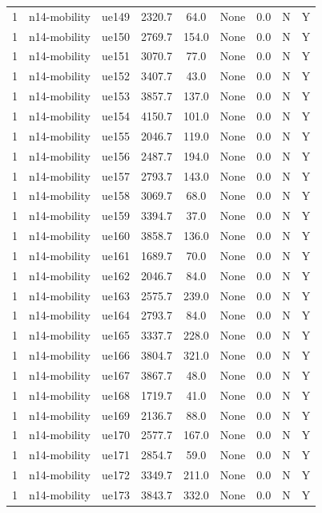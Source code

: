\begin{table}[ht]
\begin{tabular}{|c|c|c|c|c|c|c|c|c|}
1 & n14-mobility & ue149 & 2320.7 & 64.0 & None & 0.0 & N & Y \\
1 & n14-mobility & ue150 & 2769.7 & 154.0 & None & 0.0 & N & Y \\
1 & n14-mobility & ue151 & 3070.7 & 77.0 & None & 0.0 & N & Y \\
1 & n14-mobility & ue152 & 3407.7 & 43.0 & None & 0.0 & N & Y \\
1 & n14-mobility & ue153 & 3857.7 & 137.0 & None & 0.0 & N & Y \\
1 & n14-mobility & ue154 & 4150.7 & 101.0 & None & 0.0 & N & Y \\
1 & n14-mobility & ue155 & 2046.7 & 119.0 & None & 0.0 & N & Y \\
1 & n14-mobility & ue156 & 2487.7 & 194.0 & None & 0.0 & N & Y \\
1 & n14-mobility & ue157 & 2793.7 & 143.0 & None & 0.0 & N & Y \\
1 & n14-mobility & ue158 & 3069.7 & 68.0 & None & 0.0 & N & Y \\
1 & n14-mobility & ue159 & 3394.7 & 37.0 & None & 0.0 & N & Y \\
1 & n14-mobility & ue160 & 3858.7 & 136.0 & None & 0.0 & N & Y \\
1 & n14-mobility & ue161 & 1689.7 & 70.0 & None & 0.0 & N & Y \\
1 & n14-mobility & ue162 & 2046.7 & 84.0 & None & 0.0 & N & Y \\
1 & n14-mobility & ue163 & 2575.7 & 239.0 & None & 0.0 & N & Y \\
1 & n14-mobility & ue164 & 2793.7 & 84.0 & None & 0.0 & N & Y \\
1 & n14-mobility & ue165 & 3337.7 & 228.0 & None & 0.0 & N & Y \\
1 & n14-mobility & ue166 & 3804.7 & 321.0 & None & 0.0 & N & Y \\
1 & n14-mobility & ue167 & 3867.7 & 48.0 & None & 0.0 & N & Y \\
1 & n14-mobility & ue168 & 1719.7 & 41.0 & None & 0.0 & N & Y \\
1 & n14-mobility & ue169 & 2136.7 & 88.0 & None & 0.0 & N & Y \\
1 & n14-mobility & ue170 & 2577.7 & 167.0 & None & 0.0 & N & Y \\
1 & n14-mobility & ue171 & 2854.7 & 59.0 & None & 0.0 & N & Y \\
1 & n14-mobility & ue172 & 3349.7 & 211.0 & None & 0.0 & N & Y \\
1 & n14-mobility & ue173 & 3843.7 & 332.0 & None & 0.0 & N & Y \\

\end{tabular}
\end{table}

